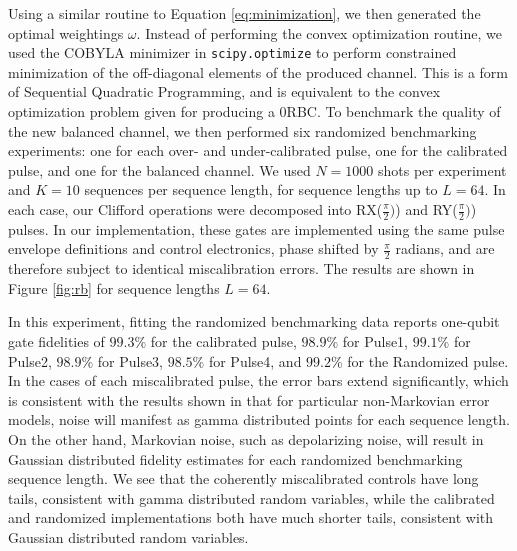 \documentclass[aps,nofootinbib,pra,notitlepage,twocolumn]{revtex4-1}
\begin{document}
 Using a similar routine to Equation \ref{eq:minimization}, we then generated the optimal weightings $\omega$. Instead of performing the convex optimization routine, we used the COBYLA minimizer in \texttt{scipy.optimize} to perform constrained minimization of the off-diagonal elements of the produced channel. This is a form of Sequential Quadratic
Programming\cite{wright1999numerical}, and is equivalent to the convex optimization problem given for producing a 0RBC. To benchmark the quality of the new balanced channel, we then performed six randomized benchmarking experiments: one for each over- and under-calibrated pulse, one for the calibrated pulse, and one for the balanced channel. We used $N=1000$ shots per experiment and $K=10$ sequences per sequence length, for sequence lengths up to $L=64$\cite{Magesan2011}. In each case, our Clifford operations were decomposed into RX($\frac{\pi}{2})$) and RY($\frac{\pi}{2})$) pulses. In our implementation, these gates are implemented using the same pulse envelope definitions and control electronics, phase shifted by $\frac{\pi}{2}$ radians, and are therefore subject to identical miscalibration errors. The results are shown in Figure \ref{fig:rb} for sequence lengths $L=64$.

In this experiment, fitting the randomized benchmarking data reports one-qubit gate fidelities of $99.3\%$ for the calibrated pulse, $98.9\%$ for Pulse1, $99.1\%$ for Pulse2, $98.9\%$ for Pulse3, $98.5\%$ for Pulse4, and $99.2\%$ for the Randomized pulse. In the cases of each miscalibrated pulse, the error bars extend significantly, which is consistent with the results shown in \cite{Ball2016} that for particular non-Markovian error models, noise will manifest as gamma distributed points for each sequence length. On the other hand, Markovian noise, such as depolarizing noise, will result in Gaussian distributed fidelity estimates for each randomized benchmarking sequence length. We see that the coherently miscalibrated controls have long tails, consistent with gamma distributed random variables, while the calibrated and randomized implementations both have much shorter tails, consistent with Gaussian distributed random variables. 
\end{document}
